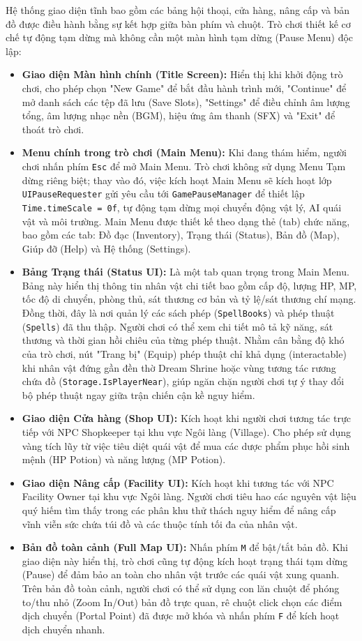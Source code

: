 \documentclass[../DoAn.tex]{subfiles}
\begin{document}
Hệ thống giao diện tĩnh bao gồm các bảng hội thoại, cửa hàng, nâng cấp và bản đồ được điều hành bằng sự kết hợp giữa bàn phím và chuột. Trò chơi thiết kế cơ chế tự động tạm dừng mà không cần một màn hình tạm dừng (Pause Menu) độc lập:
\begin{itemize}
    \item \textbf{Giao diện Màn hình chính (Title Screen):} Hiển thị khi khởi động trò chơi, cho phép chọn "New Game" để bắt đầu hành trình mới, "Continue" để mở danh sách các tệp đã lưu (Save Slots), "Settings" để điều chỉnh âm lượng tổng, âm lượng nhạc nền (BGM), hiệu ứng âm thanh (SFX) và "Exit" để thoát trò chơi.
    \item \textbf{Menu chính trong trò chơi (Main Menu):} Khi đang thám hiểm, người chơi nhấn phím \texttt{Esc} để mở Main Menu. Trò chơi không sử dụng Menu Tạm dừng riêng biệt; thay vào đó, việc kích hoạt Main Menu sẽ kích hoạt lớp \texttt{UIPauseRequester} gửi yêu cầu tới \texttt{GamePauseManager} để thiết lập \texttt{Time.timeScale = 0f}, tự động tạm dừng mọi chuyển động vật lý, AI quái vật và môi trường. Main Menu được thiết kế theo dạng thẻ (tab) chức năng, bao gồm các tab: Đồ đạc (Inventory), Trạng thái (Status), Bản đồ (Map), Giúp đỡ (Help) và Hệ thống (Settings).
    \item \textbf{Bảng Trạng thái (Status UI):} Là một tab quan trọng trong Main Menu. Bảng này hiển thị thông tin nhân vật chi tiết bao gồm cấp độ, lượng HP, MP, tốc độ di chuyển, phòng thủ, sát thương cơ bản và tỷ lệ/sát thương chí mạng. Đồng thời, đây là nơi quản lý các sách phép (\texttt{SpellBooks}) và phép thuật (\texttt{Spells}) đã thu thập. Người chơi có thể xem chi tiết mô tả kỹ năng, sát thương và thời gian hồi chiêu của từng phép thuật. Nhằm cân bằng độ khó của trò chơi, nút "Trang bị" (Equip) phép thuật chỉ khả dụng (interactable) khi nhân vật đứng gần đền thờ Dream Shrine hoặc vùng tương tác rương chứa đồ (\texttt{Storage.IsPlayerNear}), giúp ngăn chặn người chơi tự ý thay đổi bộ phép thuật ngay giữa trận chiến cận kề nguy hiểm.
    \item \textbf{Giao diện Cửa hàng (Shop UI):} Kích hoạt khi người chơi tương tác trực tiếp với NPC Shopkeeper tại khu vực Ngôi làng (Village). Cho phép sử dụng vàng tích lũy từ việc tiêu diệt quái vật để mua các dược phẩm phục hồi sinh mệnh (HP Potion) và năng lượng (MP Potion).
    \item \textbf{Giao diện Nâng cấp (Facility UI):} Kích hoạt khi tương tác với NPC Facility Owner tại khu vực Ngôi làng. Người chơi tiêu hao các nguyên vật liệu quý hiếm tìm thấy trong các phân khu thử thách nguy hiểm để nâng cấp vĩnh viễn sức chứa túi đồ và các thuộc tính tối đa của nhân vật.
    \item \textbf{Bản đồ toàn cảnh (Full Map UI):} Nhấn phím \texttt{M} để bật/tắt bản đồ. Khi giao diện này hiển thị, trò chơi cũng tự động kích hoạt trạng thái tạm dừng (Pause) để đảm bảo an toàn cho nhân vật trước các quái vật xung quanh. Trên bản đồ toàn cảnh, người chơi có thể sử dụng con lăn chuột để phóng to/thu nhỏ (Zoom In/Out) bản đồ trực quan, rê chuột click chọn các điểm dịch chuyển (Portal Point) đã được mở khóa và nhấn phím \texttt{F} để kích hoạt dịch chuyển nhanh.
\end{itemize}
\end{document}
